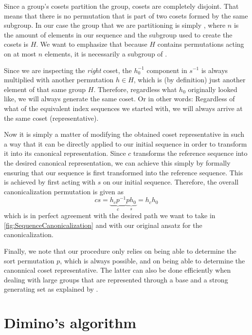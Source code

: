 \documentclass[parskip=half]{scrartcl}
\begin{document}
	Since a group's cosets partition the group, cosets are completely disjoint. That means that there is no permutation that is part of two cosets
	formed by the same subgroup. In our case the group that we are partitioning is simply , where $n$ is the amount of elements in our sequence
	and the subgroup used to create the cosets is $H$. We want to emphasize that because $H$ contains permutations acting on at most $n$ elements, it
	is necessarily a subgroup of .

	Since we are inspecting the \emph{right} coset, the $h_0^{-1}$ component in $s^{-1}$ is always multiplied with another permutation $h \in H$,
	which is (by definition) just another element of that same group $H$. Therefore, regardless what $h_0$ originally looked like, we will
	always generate the same coset. Or in other words: Regardless of what of the equivalent index sequences we started with, we will always arrive at
	the same coset (representative).

	Now it is simply a matter of modifying the obtained coset representative in such a way that it can be directly applied to our initial sequence in
	order to transform it into its canonical representation. Since $c$ transforms the reference sequence into the desired canonical representation, we
	can achieve this simply by formally ensuring that our sequence is first transformed into the reference sequence. This is achieved by first acting
	with $s$ on our initial sequence. Therefore, the overall canonicalization permutation is given as
	\begin{equation}
		c s = \underbrace{h_c p^{-1}}_{c} \underbrace{p h_0}_{s} = h_c h_0
	\end{equation}
	which is in perfect agreement with the desired path we want to take in \cref{fig:SequenceCanonicalization} and with our original ansatz for the
	canonicalization.

	Finally, we note that our procedure only relies on being able to determine the sort permutation $p$, which is always possible, and on being able
	to determine the canonnical coset representative. The latter can also be done efficiently when dealing with large groups that are represented
	through a base and a strong generating set as explained by \textcite{Manssur2002a}.


	\appendix

	\section{Dimino's algorithm}
	\label{sec:DiminoAlgorithm}
\end{document}
